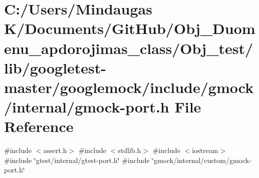 \hypertarget{_obj__test_2lib_2googletest-master_2googlemock_2include_2gmock_2internal_2gmock-port_8h}{}\section{C\+:/\+Users/\+Mindaugas K/\+Documents/\+Git\+Hub/\+Obj\+\_\+\+Duomenu\+\_\+apdorojimas\+\_\+class/\+Obj\+\_\+test/lib/googletest-\/master/googlemock/include/gmock/internal/gmock-\/port.h File Reference}
\label{_obj__test_2lib_2googletest-master_2googlemock_2include_2gmock_2internal_2gmock-port_8h}
{\ttfamily \#include $<$assert.\+h$>$}\newline
{\ttfamily \#include $<$stdlib.\+h$>$}\newline
{\ttfamily \#include $<$iostream$>$}\newline
{\ttfamily \#include \char`\"{}gtest/internal/gtest-\/port.\+h\char`\"{}}\newline
{\ttfamily \#include \char`\"{}gmock/internal/custom/gmock-\/port.\+h\char`\"{}}\newline
